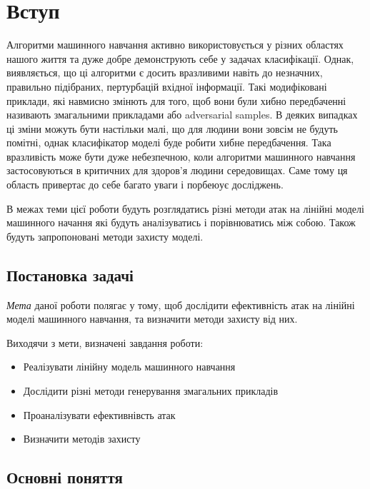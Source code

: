 \documentclass[a4paper,12pt]{extreport}
\begin{document}
	
	\tableofcontents
	\newpage

	
	
	\chapter{Вступ}
	Алгоритми машинного навчання активно використовується у різних областях нашого життя та дуже добре демонструють себе у задачах класифікації. Однак, виявляється, що ці алгоритми є досить вразливими навіть до незначних, правильно підібраних, пертурбацій вхідної інформації. Такі модифіковані приклади, які навмисно змінють для того, щоб вони були хибно передбаченні називають змагальними прикладами або adversarial samples. В деяких випадках ці зміни можуть бути настільки малі, що для людини вони зовсім не будуть помітні, однак класифікатор моделі буде робити хибне передбачення. Така вразливість може бути дуже небезпечною, коли алгоритми машинного навчання застосовуються в критичних для здоров'я людини середовищах. Саме тому ця область привертає до себе багато уваги і порбеюує досліджень. 
	
	В межах теми цієї роботи будуть розглядатись різні методи атак на лінійні моделі машинного начання які будуть аналізуватись і порівнюватись між собою. Також будуть запропоновані методи захисту моделі.
	
	\section{Постановка задачі} 
	
	\textit{Мета} даної роботи полягає у тому, щоб дослідити ефективність атак на лінійні моделі машинного навчання, та визначити методи захисту від них. \par
	Виходячи з мети, визначені завдання роботи:
	\begin{itemize}
	\item Реалізувати лінійну модель машинного навчання
	\item Дослідити різні методи генерування змагальних прикладів
	\item Проаналізувати ефективнівсть атак
	\item Визначити методів захисту
	\end{itemize}

	
	\section{Основні поняття}
	
\end{document}
